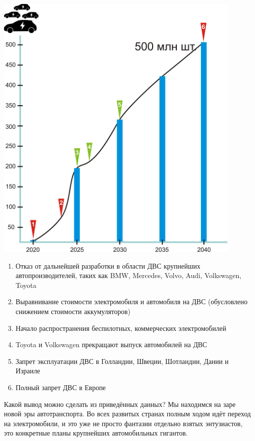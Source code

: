 \documentclass[a4paper,12pt]{report}
\begin{document}
\vspace*{1cm}
\includegraphics[width=12cm]{chart2}
\vspace*{1cm}

\begin{enumerate}
	\item Отказ от дальнейшей разработки в области ДВС крупнейших автопроизводителей, таких как BMW, Mercedes, Volvo, Audi, Volkswagen, Toyota
	\item Выравнивание стоимости электромобиля и автомобиля на ДВС (обусловлено снижением стоимости аккумуляторов)
	\item Начало распространения беспилотных, коммерческих электромобилей
	\item Toyota и Volkswagen прекращают выпуск автомобилей на ДВС
	\item Запрет эксплуатации ДВС в Голландии, Швеции, Шотландии, Дании и Израиле
	\item Полный запрет ДВС в Европе
\end{enumerate}


Какой вывод можно сделать из приведённых данных? Мы находимся на заре новой эры автотранспорта. Во всех развитых странах полным ходом идёт переход на электромобили, и это уже не просто фантазии отдельно взятых энтузиастов, это конкретные планы крупнейших автомобильных гигантов. 
\end{document}
